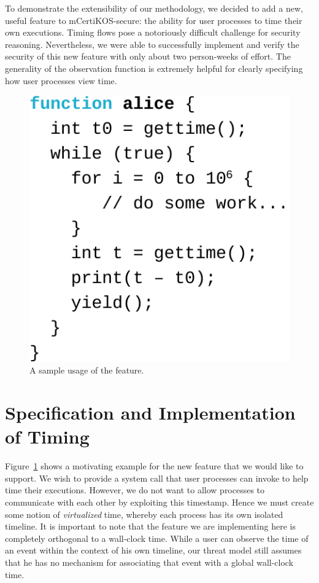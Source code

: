 \label{timing-chapter}

To demonstrate the extensibility of our methodology, we
decided to add a new, useful feature to mCertiKOS-secure:
the ability for user processes to time their own executions.
Timing flows pose a notoriously difficult challenge for
security reasoning. Nevertheless, we were able to successfully
implement and verify the security of this new feature with
only about two person-weeks of effort. The generality of the
observation function is extremely helpful for clearly specifying
how user processes view time.

\begin{figure}[t]
\begin{center}
\includegraphics[scale=0.55]{pldi/figure/gettime}
\caption{\small A sample usage of the \gett{} feature.}
\label{fig:gettime}
\end{center}
\end{figure}

\section{Specification and Implementation of Timing}
Figure~\ref{fig:gettime} shows a motivating example for the
new feature that we would like to support. We wish to
provide a system call \gett{} that user processes
can invoke to help time their executions. However, we do
not want to allow processes to communicate with each other
by exploiting this timestamp. Hence we must create some notion
of \emph{virtualized} time, whereby each process has its
own isolated timeline.
It is important to note that the feature we are implementing
here is completely orthogonal to a wall-clock time. While
a user can observe the time of an event within the context of
his own timeline, our threat model still assumes that he has
no mechanism for associating that event with a global
wall-clock time.

